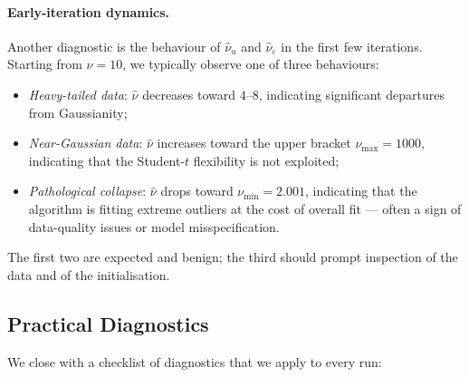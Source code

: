 \documentclass[11pt, a4paper, oneside]{article}
\begin{document}
\paragraph{Early-iteration dynamics.}
Another diagnostic is the behaviour of $\hat{\nu}_u$ and
$\hat{\nu}_\varepsilon$ in the first few iterations. Starting from
$\nu = 10$, we typically observe one of three behaviours:

\begin{itemize}[leftmargin=1.5em, itemsep=2pt]
    \item \emph{Heavy-tailed data}: $\hat{\nu}$ decreases toward
          $4$--$8$, indicating significant departures from Gaussianity;
    \item \emph{Near-Gaussian data}: $\hat{\nu}$ increases toward the
          upper bracket $\nu_{\max} = 1000$, indicating that the
          Student-$t$ flexibility is not exploited;
    \item \emph{Pathological collapse}: $\hat{\nu}$ drops toward
          $\nu_{\min} = 2.001$, indicating that the algorithm is
          fitting extreme outliers at the cost of overall fit — often
          a sign of data-quality issues or model misspecification.
\end{itemize}
The first two are expected and benign; the third should prompt
inspection of the data and of the initialisation.

\subsection{Practical Diagnostics}
\label{subsec:diagnostics}

We close with a checklist of diagnostics that we apply to every run:
\end{document}
